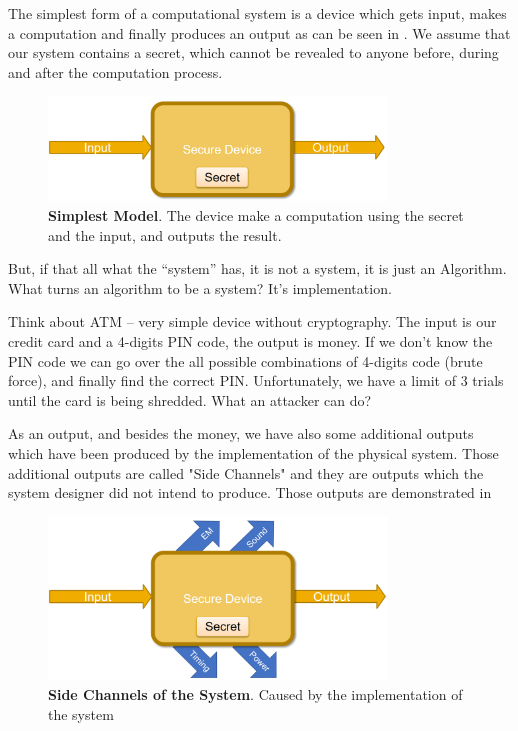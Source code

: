 The simplest form of a computational system is a device which gets input, makes a computation and finally produces an output as can be seen in . We assume that our system contains a secret, which cannot be revealed to anyone before, during and after the computation process. 

\begin{figure}[htb]
    \centering
    \includegraphics[width=0.8\textwidth]{images/ch1_Intro/Secure_device1.png}
    \caption{\textbf{Simplest Model}. The device make a computation using the secret and the input, and outputs the result.}
    \label{fig:SecDev1}
\end{figure}

But, if that all what the “system” has, it is not a system, it is just an Algorithm. What turns an algorithm to be a system? It’s implementation.

Think about ATM – very simple device without cryptography. The input is our credit card and a 4-digits PIN code, the output is money. If we don’t know the PIN code we can go over the all possible combinations of 4-digits code (brute force), and finally find the correct PIN. Unfortunately, we have a limit of 3 trials until the card is being shredded. What an attacker can do?

As an output, and besides the money, we have also some additional outputs which have been produced by the implementation of the physical system. Those additional outputs are called "Side Channels" and they are outputs which the system designer did not intend to produce. Those outputs are demonstrated in 

\begin{figure}[htb]
    \centering
    \cent
    \includegraphics[width=0.8\textwidth]{images/ch1_Intro/Secure_device2.png}
    \caption{\textbf{Side Channels of the System}. Caused by the implementation of the system}
    \label{fig:SecDev2}
\end{figure}

